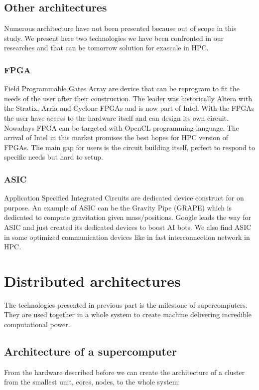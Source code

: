 \subsection{Other architectures}
Numerous architecture have not been presented because out of scope in this study. 
We present here two technologies we have been confronted in our researches and that can be tomorrow solution for exascale in HPC. 
\subsubsection{FPGA}
Field Programmable Gates Array are device that can be reprogram to fit the needs of the user after their construction.
The leader was historically Altera with the Stratix, Arria and Cyclone FPGAs and is now part of Intel. 
With the FPGAs the user have access to the hardware itself and can design its own circuit. 
Nowadays FPGA can be targeted with OpenCL programming language. 
The arrival of Intel in this market promises the best hopes for HPC version of FPGAs. 
The main gap for users is the circuit building itself, perfect to respond to specific needs but hard to setup. 
\subsubsection{ASIC}
Application Specified Integrated Circuits are dedicated device construct for on purpose. 
An example of ASIC can be the Gravity Pipe (GRAPE) which is dedicated to compute gravitation given mass/positions.
Google leads the way for ASIC and just created its dedicated devices to boost AI bots.
We also find ASIC in some optimized communication devices like in fast interconnection network in HPC.  

\section{Distributed architectures}

The technologies presented in previous part is the milestone of supercomputers. 
They are used together in a whole system to create machine delivering incredible computational power.

\subsection{Architecture of a supercomputer}
From the hardware described before we can create the architecture of a cluster from the smallest unit, cores, nodes, to the whole system: 


